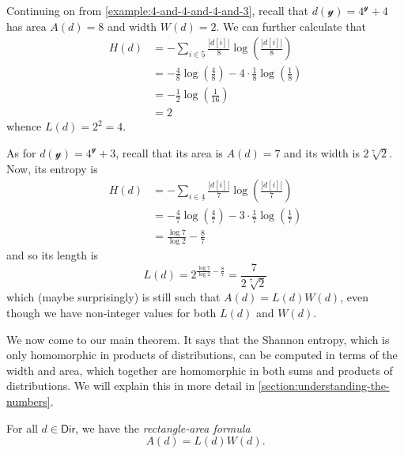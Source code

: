 \documentclass[11pt,fleqn]{article}
\newcommand{\yon}{\mathcal{y}}
\newcommand{\rig}[1]{\mathsf{#1}}
\newcommand{\Dir}{\rig{Dir}}
\begin{document}
\begin{example}
  Continuing on from \cref{example:4-and-4-and-4-and-3}, recall that $d(\yon)=4^\yon+4$ has area $A(d)=8$ and width $W(d)=2$.
  We can further calculate that
  \[
    \begin{aligned}
      H(d)
      &= -\sum_{i\in\underline{5}}\frac{|d[i]|}{8}\log\left(\frac{|d[i]|}{8}\right)
    \\&= -\frac{4}{8}\log\left(\frac{4}{8}\right) - 4\cdot\frac{1}{8}\log\left(\frac{1}{8}\right)
    \\&= -\frac{1}{2}\log\left(\frac{1}{16}\right)
    \\&= 2
    \end{aligned}
  \]
  whence $L(d) = 2^2 = 4$.

  \medskip

  As for $d(\yon)=4^\yon+3$, recall that its area is $A(d)=7$ and its width is $2\sqrt[7]{2}$.
  Now, its entropy is
  \[
    \begin{aligned}
      H(d)
      &= -\sum_{i\in\underline{4}}\frac{|d[i]|}{7}\log\left(\frac{|d[i]|}{7}\right)
    \\&= -\frac{4}{7}\log\left(\frac{4}{7}\right) - 3\cdot\frac{1}{7}\log\left(\frac{1}{7}\right)
    \\&= \frac{\log7}{\log2} - \frac{8}{7}
    \end{aligned}
  \]
  and so its length is
  \[
    L(d) = 2^{\frac{\log7}{\log2} - \frac{8}{7}} = \frac{7}{2\sqrt[7]{2}}
  \]
  which (maybe surprisingly) is still such that $A(d)=L(d)W(d)$, even though we have non-integer values for both $L(d)$ and $W(d)$.
\end{example}

We now come to our main theorem.
It says that the Shannon entropy, which is only homomorphic in products of distributions, can be computed in terms of the width and area, which together are homomorphic in both sums and products of distributions.
We will explain this in more detail in \cref{section:understanding-the-numbers}.

\begin{theorem}
\label{theorem:rectangle-area-formula}
  For all $d\in\Dir$, we have the \emph{rectangle-area formula}
  \[
    A(d) = L(d)W(d).
  \]
\end{theorem}
\end{document}
